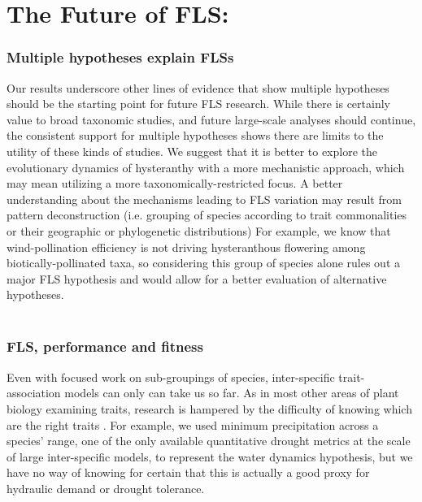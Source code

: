 \documentclass{article}
\begin{document}
\section*{The Future of FLS:}
\subsubsection*{Multiple hypotheses explain FLSs}
\noindent Our results underscore other lines of evidence that show multiple hypotheses should be the starting point for future FLS research. While there is certainly value to broad taxonomic studies, and future large-scale analyses should continue, the consistent support for multiple hypotheses shows there are limits to the utility of these kinds of studies. We suggest that it is better to explore the evolutionary dynamics of hysteranthy with a more mechanistic approach, which may mean utilizing a more taxonomically-restricted focus. A better understanding about the mechanisms leading to FLS variation may result from pattern deconstruction (i.e. grouping of species according to trait commonalities or their geographic or phylogenetic distributions) \citep{Terribile2009} For example, we know that wind-pollination efficiency is not driving hysteranthous flowering among biotically-pollinated taxa, so considering this group of species alone rules out a major FLS hypothesis and would allow for a better evaluation of alternative hypotheses.\\ 

\subsubsection*{FLS, performance and fitness}
Even with focused work on sub-groupings of species, inter-specific trait-association models can only can take us so far. As in most other areas of plant biology examining traits, research is hampered by the difficulty of knowing which are the right traits \citep{Violle2007}. For example, we used minimum precipitation across a species' range, one of the only available quantitative drought metrics at the scale of large inter-specific models, to represent the water dynamics hypothesis, but we have no way of knowing for certain that this is actually a good proxy for hydraulic demand or drought tolerance. \\
\end{document}

